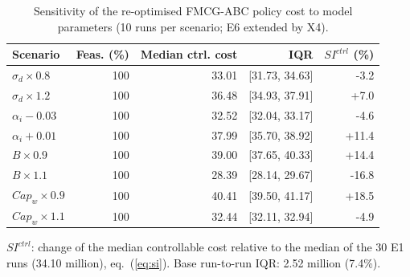 \begin{table}[!t]
\centering
\footnotesize
\caption{Sensitivity of the re-optimised FMCG-ABC policy cost to model parameters (10 runs per scenario; E6 extended by X4).}\label{tab:sens}
\begin{tabular}{lrrrr}
\toprule
Scenario & Feas. (\%) & Median ctrl. cost & IQR & $SI^{ctrl}$ (\%) \\
\midrule
$\sigma_d\times0.8$ & 100 & 33.01 & [31.73, 34.63] & -3.2 \\
$\sigma_d\times1.2$ & 100 & 36.48 & [34.93, 37.91] & +7.0 \\
$\alpha_i-0.03$ & 100 & 32.52 & [32.04, 33.17] & -4.6 \\
$\alpha_i+0.01$ & 100 & 37.99 & [35.70, 38.92] & +11.4 \\
$B\times0.9$ & 100 & 39.00 & [37.65, 40.33] & +14.4 \\
$B\times1.1$ & 100 & 28.39 & [28.14, 29.67] & -16.8 \\
$Cap_w\times0.9$ & 100 & 40.41 & [39.50, 41.17] & +18.5 \\
$Cap_w\times1.1$ & 100 & 32.44 & [32.11, 32.94] & -4.9 \\
\bottomrule
\end{tabular}
\par\smallskip\parbox{0.95\linewidth}{\scriptsize $SI^{ctrl}$: change of the median controllable cost relative to the median of the 30 E1 runs (34.10 million), eq.~(\ref{eq:si}). Base run-to-run IQR: 2.52 million (7.4\%).}
\end{table}
